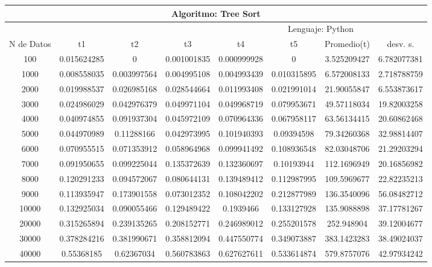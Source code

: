 \documentclass{article}
\begin{document}
		

	\begin{table}[]
        \begin{tabular}{|c|c|c|c|c|c|c|c| }
            \hline
            \multicolumn{8}{|c|}{Algoritmo: Tree Sort} \\ \hline
            \multicolumn{4}{|c|}{} & \multicolumn{4}{c|}{Lenguaje: Python} \\ \hline
              N de Datos &     t1    &  t2         &  t3          &   t4        &    t5     &   Promedio(t)       & desv. s. \\ \hline
100	    &0.015624285	&0	        &0.001001835	&0.000999928	&0	        &3.525209427	&6.782077381 \\ \hline
1000	&0.008558035	&0.003997564	&0.004995108	&0.004993439	&0.010315895	&6.572008133	&2.718788759\\ \hline
2000	&0.019988537	&0.026985168	&0.028544664	&0.011993408	&0.021991014	&21.90055847	&6.553873617\\ \hline
3000	&0.024986029	&0.042976379	&0.049971104	&0.049968719	&0.079953671	&49.57118034	&19.82003258\\ \hline
4000	&0.040974855	&0.091937304	&0.045972109	&0.070964336	&0.067958117	&63.56134415	&20.60862468\\ \hline
5000	&0.044970989	&0.11288166	&0.042973995	&0.101940393	&0.09394598	&79.34260368	&32.98814407\\ \hline
6000	&0.070955515	&0.071353912	&0.058964968	&0.099941492	&0.108936548	&82.03048706	&21.29203294\\ \hline
7000	&0.091950655	&0.099225044	&0.135372639	&0.132360697	&0.10193944	&112.1696949	&20.16856982\\ \hline
8000	&0.120291233	&0.094572067	&0.080644131	&0.139489412	&0.112987995	&109.5969677	&22.82235213\\ \hline
9000	&0.113935947	&0.173901558	&0.073012352	&0.108042202	&0.212877989	&136.3540096	&56.08482712\\ \hline
10000	&0.132925034	&0.090055466	&0.129489422	&0.1939466	&0.133127928	&135.9088898	&37.17781267\\ \hline
20000	&0.315265894	&0.239135265	&0.208152771	&0.246989012	&0.255201578	&252.948904	&39.12004677\\ \hline
30000	&0.378284216	&0.381990671	&0.358812094	&0.447550774	&0.349073887	&383.1423283	&38.49024037\\ \hline
40000	&0.55368185	&0.62367034	&0.560783863	&0.627627611	&0.533614874	&579.8757076	&42.97934242\\ \hline

\end{tabular}
\end{table}
\end{document}
